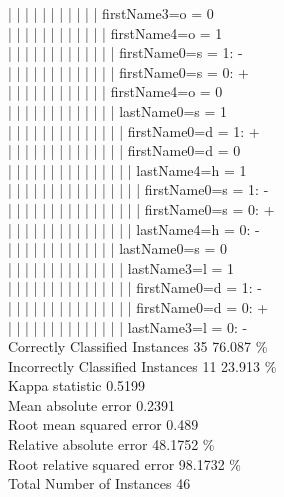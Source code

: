 \begin{enumerate}
|  |  |  |  |  |  |  |  |  |  |  firstName3=o = 0\\
|  |  |  |  |  |  |  |  |  |  |  |  firstName4=o = 1\\
|  |  |  |  |  |  |  |  |  |  |  |  |  firstName0=s = 1: -\\
|  |  |  |  |  |  |  |  |  |  |  |  |  firstName0=s = 0: +\\
|  |  |  |  |  |  |  |  |  |  |  |  firstName4=o = 0\\
|  |  |  |  |  |  |  |  |  |  |  |  |  lastName0=s = 1\\
|  |  |  |  |  |  |  |  |  |  |  |  |  |  firstName0=d = 1: +\\
|  |  |  |  |  |  |  |  |  |  |  |  |  |  firstName0=d = 0\\
|  |  |  |  |  |  |  |  |  |  |  |  |  |  |  lastName4=h = 1\\
|  |  |  |  |  |  |  |  |  |  |  |  |  |  |  |  firstName0=s = 1: -\\
|  |  |  |  |  |  |  |  |  |  |  |  |  |  |  |  firstName0=s = 0: +\\
|  |  |  |  |  |  |  |  |  |  |  |  |  |  |  lastName4=h = 0: -\\
|  |  |  |  |  |  |  |  |  |  |  |  |  lastName0=s = 0\\
|  |  |  |  |  |  |  |  |  |  |  |  |  |  lastName3=l = 1\\
|  |  |  |  |  |  |  |  |  |  |  |  |  |  |  firstName0=d = 1: -\\
|  |  |  |  |  |  |  |  |  |  |  |  |  |  |  firstName0=d = 0: +\\
|  |  |  |  |  |  |  |  |  |  |  |  |  |  lastName3=l = 0: -\\
Correctly Classified Instances          35       \hspace*{20 mm}        76.087 \%\\
Incorrectly Classified Instances        11       \hspace*{20 mm}        23.913  \%\\
Kappa statistic                          0.5199\\
Mean absolute error                      0.2391\\
Root mean squared error                  0.489 \\
Relative absolute error                 48.1752 \%\\
Root relative squared error             98.1732 \%\\
Total Number of Instances               46\\\\     

\end{enumerate}
